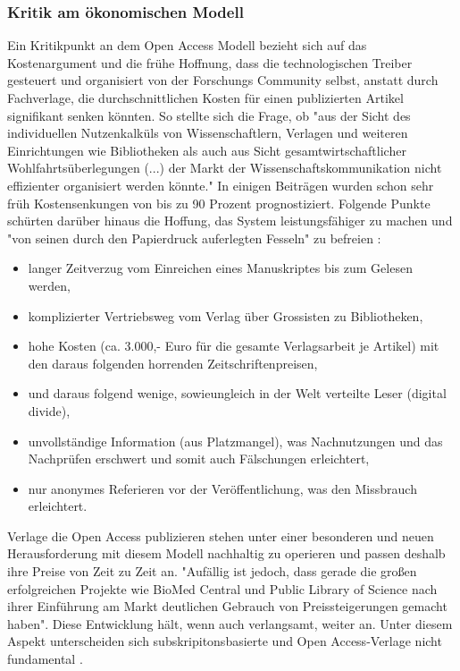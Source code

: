 \subsubsection{Kritik am ökonomischen Modell}

Ein Kritikpunkt an dem Open Access Modell bezieht sich auf das Kostenargument und die frühe Hoffnung, dass die technologischen Treiber gesteuert und organisiert von der Forschungs Community selbst, anstatt durch Fachverlage, die durchschnittlichen Kosten für einen publizierten Artikel signifikant senken könnten. So stellte sich die Frage, ob
"aus der Sicht des individuellen Nutzenkalküls von Wissenschaftlern, Verlagen und weiteren Einrichtungen wie Bibliotheken als auch aus Sicht gesamtwirtschaftlicher Wohlfahrtsüberlegungen (...) der Markt der Wissenschaftskommunikation nicht effizienter organisiert werden könnte."\cite{Hess_2006} In einigen Beiträgen wurden schon sehr früh Kostensenkungen von bis zu 90 Prozent \cite{hilf_2004} \cite{suchen} prognostiziert. Folgende Punkte schürten darüber hinaus die Hoffung, das System leistungsfähiger zu machen und "von seinen durch den Papierdruck auferlegten Fesseln" zu befreien \cite{hilf_2004}:
\begin{itemize}
\item langer Zeitverzug vom Einreichen eines Manuskriptes bis zum Gelesen werden,
\item komplizierter Vertriebsweg vom Verlag über Grossisten zu Bibliotheken,
\item hohe Kosten (ca. 3.000,- Euro für die gesamte Verlagsarbeit je Artikel) mit den daraus folgenden horrenden Zeitschriftenpreisen,
\item und daraus folgend wenige, sowieungleich in der Welt verteilte Leser (digital divide),
\item unvollständige Information (aus Platzmangel), was Nachnutzungen und das Nachprüfen erschwert und somit auch Fälschungen erleichtert,
\item nur anonymes Referieren vor der Veröffentlichung, was den Missbrauch erleichtert. 
\end{itemize}

Verlage die Open Access publizieren stehen unter einer besonderen und neuen Herausforderung mit diesem Modell nachhaltig zu operieren und passen deshalb ihre Preise von Zeit zu Zeit an. "Aufällig ist jedoch, dass gerade die großen erfolgreichen Projekte wie BioMed Central und Public Library of Science nach ihrer Einführung am Markt deutlichen Gebrauch von Preissteigerungen gemacht haben"\cite{schmidt_2007_goldenen}. Diese Entwicklung hält, wenn auch verlangsamt, weiter an\cite{suchen}. Unter diesem Aspekt unterscheiden sich subskripitonsbasierte und Open Access-Verlage nicht fundamental \cite{schmidt_2007_goldenen}.

